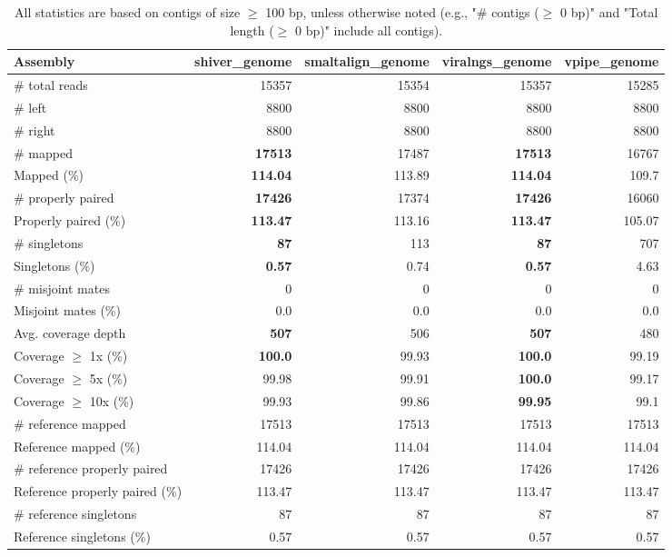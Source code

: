 \documentclass[12pt,a4paper]{article}
\begin{document}
\begin{table}[ht]
\begin{center}
\caption{All statistics are based on contigs of size $\geq$ 100 bp, unless otherwise noted (e.g., "\# contigs ($\geq$ 0 bp)" and "Total length ($\geq$ 0 bp)" include all contigs).}
\begin{tabular}{|l*{4}{|r}|}
\hline
Assembly & shiver\_genome & smaltalign\_genome & viralngs\_genome & vpipe\_genome \\ \hline
\# total reads & 15357 & 15354 & 15357 & 15285 \\ \hline
\# left & 8800 & 8800 & 8800 & 8800 \\ \hline
\# right & 8800 & 8800 & 8800 & 8800 \\ \hline
\# mapped & {\bf 17513} & 17487 & {\bf 17513} & 16767 \\ \hline
Mapped (\%) & {\bf 114.04} & 113.89 & {\bf 114.04} & 109.7 \\ \hline
\# properly paired & {\bf 17426} & 17374 & {\bf 17426} & 16060 \\ \hline
Properly paired (\%) & {\bf 113.47} & 113.16 & {\bf 113.47} & 105.07 \\ \hline
\# singletons & {\bf 87} & 113 & {\bf 87} & 707 \\ \hline
Singletons (\%) & {\bf 0.57} & 0.74 & {\bf 0.57} & 4.63 \\ \hline
\# misjoint mates & 0 & 0 & 0 & 0 \\ \hline
Misjoint mates (\%) & 0.0 & 0.0 & 0.0 & 0.0 \\ \hline
Avg. coverage depth & {\bf 507} & 506 & {\bf 507} & 480 \\ \hline
Coverage $\geq$ 1x (\%) & {\bf 100.0} & 99.93 & {\bf 100.0} & 99.19 \\ \hline
Coverage $\geq$ 5x (\%) & 99.98 & 99.91 & {\bf 100.0} & 99.17 \\ \hline
Coverage $\geq$ 10x (\%) & 99.93 & 99.86 & {\bf 99.95} & 99.1 \\ \hline
\# reference mapped & 17513 & 17513 & 17513 & 17513 \\ \hline
Reference mapped (\%) & 114.04 & 114.04 & 114.04 & 114.04 \\ \hline
\# reference properly paired & 17426 & 17426 & 17426 & 17426 \\ \hline
Reference properly paired (\%) & 113.47 & 113.47 & 113.47 & 113.47 \\ \hline
\# reference singletons & 87 & 87 & 87 & 87 \\ \hline
Reference singletons (\%) & 0.57 & 0.57 & 0.57 & 0.57 \\ \hline

\end{tabular}
\end{center}
\end{table}
\end{document}
